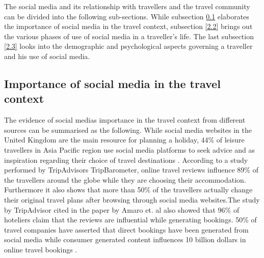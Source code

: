 The social media and its relationship with travellers and the travel community can be divided into the following sub-sections. While subsection \ref{2.1} elaborates the importance of social media in the travel context, subsection \ref{2.2} brings out the various phases of use of social media in a traveller's life. The last subsection \ref{2.3} looks into the demographic and psychological aspects governing a traveller and his use of social media.

\subsection{Importance of social media in the travel context}\label{2.1}

The evidence of social media\textquotesingle s importance in the travel context from different sources can be summarised as the following. While social media websites in the United Kingdom are the main resource for planning a holiday, 44\% of leisure travellers in Asia Pacific region use social media platforms to seek advice and as inspiration regarding their choice of travel destinations \cite{amaro2016travelers}. According to a study performed by TripAdvisor\textquotesingle s TripBarometer, online travel reviews influence 89\% of the travellers around the globe while they are choosing their accommodation. Furthermore it also shows that more than 50\% of the travellers actually change their original travel plans after browsing through social media websites\cite{amaro2016travelers}.The study by TripAdvisor cited in the paper by Amaro et. al also showed that 96\% of hoteliers claim that the reviews are influential while generating bookings. 50\% of travel companies have asserted that direct bookings have been generated from social media while consumer generated content influences 10 billion dollars in online travel bookings \cite{amaro2016travelers}.

